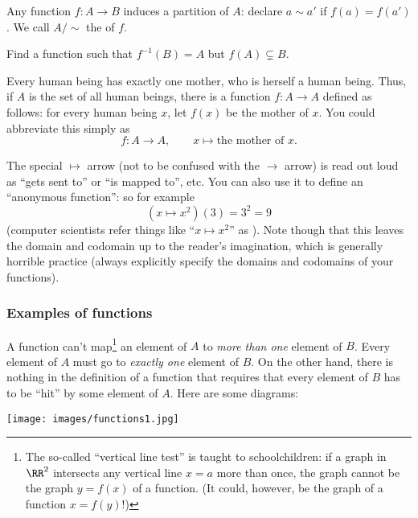 \begin{remark}
Any function $f : A \to B$ induces a partition of $A$: declare $a \sim a'$ if $f(a)=f(a')$. We call $A/\sim$ the  of $f$.
\end{remark}

\begin{exercise}[FIXME]
Find a function such that $f^{-1}(B) = A$ but $f(A) \subsetneq B$.
\end{exercise}

\begin{example}[FIXME]
Every human being has exactly one mother, who is herself a human being. Thus, if $A$ is the set of all human beings, there is a function $f : A \to A$ defined as follows: for every human being $x$, let $f(x)$ be the mother of $x$. You could abbreviate this simply as
\[ f : A \to A, \qquad x \mapsto \text{the mother of $x$}. \]
\end{example}

The special $\mapsto$ arrow (not to be confused with the $\to$ arrow) is read out loud as ``gets sent to'' or ``is mapped to'', etc. You can also use it to define an ``anonymous function'': so for example
\[ (x \mapsto x^2)(3) = 3^2 = 9 \]
(computer scientists refer things like ``$x \mapsto x^2$'' as ). Note though that this leaves the domain and codomain up to the reader's imagination, which is generally horrible practice (always explicitly specify the domains and codomains of your functions).

\subsubsection{Examples of functions}

A function can't map\footnote{The so-called ``vertical line test'' is taught to schoolchildren: if a graph in $\RR^2$ intersects any vertical line $x=a$ more than once, the graph cannot be the graph $y=f(x)$ of a function. (It could, however, be the graph of a function $x=f(y)$!)} an element of $A$ to \emph{more than one} element of $B$. Every element of $A$ must go to \emph{exactly one} element of $B$. On the other hand, there is nothing in the definition of a function that requires that every element of $B$ has to be ``hit'' by some element of $A$. Here are some diagrams:

\begin{center}
\texttt{[image: images/functions1.jpg]}
\end{center}

